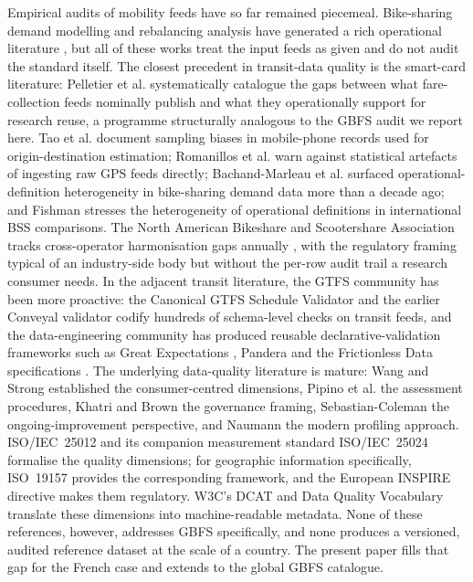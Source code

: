 \documentclass[11pt,a4paper]{article}
\begin{document}
Empirical audits of mobility feeds have so far remained piecemeal.
Bike-sharing demand modelling and rebalancing analysis have generated
a rich operational literature
\cite{Buehler2017BikeShare,Medard2017Rebalancing,Eren2020Review}, but
all of these works treat the input feeds as given and do not audit
the standard itself. The closest precedent in transit-data quality
is the smart-card literature: Pelletier et al.
\cite{Pelletier2011SmartCard} systematically catalogue the gaps
between what fare-collection feeds nominally publish and what they
operationally support for research reuse, a programme structurally
analogous to the GBFS audit we report here.
Tao et al. \cite{Tao2020} document sampling biases in
mobile-phone records used for origin-destination estimation;
Romanillos et al. \cite{Romanillos2016} warn against
statistical artefacts of ingesting raw GPS feeds directly;
Bachand-Marleau et al. \cite{BachandMarleau2012} surfaced
operational-definition heterogeneity in bike-sharing demand data
more than a decade ago; and Fishman \cite{Fishman2016} stresses the
heterogeneity of operational definitions in international BSS
comparisons. The North American Bikeshare and Scootershare
Association tracks cross-operator harmonisation gaps annually
\cite{NABSA2024StateOfIndustry}, with the regulatory framing
typical of an industry-side body but without the per-row audit
trail a research consumer needs.
In the adjacent transit literature, the GTFS community has been more
proactive: the Canonical GTFS Schedule Validator
\cite{MobilityData2024Validator} and the earlier Conveyal validator
\cite{Antrim2013Conveyal} codify hundreds of schema-level checks on
transit feeds, and the data-engineering community has produced reusable
declarative-validation frameworks such as Great Expectations
\cite{GreatExpectations2024}, Pandera \cite{Pandera2024} and the
Frictionless Data specifications \cite{FrictionlessData2023}.
The underlying data-quality literature is mature: Wang and Strong
\cite{Wang1996Quality} established the consumer-centred dimensions,
Pipino et al. \cite{Pipino2002Assessment} the assessment
procedures, Khatri and Brown \cite{Khatri2010DataGovernance} the
governance framing, Sebastian-Coleman \cite{SebastianColeman2013}
the ongoing-improvement perspective, and Naumann
\cite{Naumann2014DataProfiling} the modern profiling approach. ISO/IEC~25012 \cite{ISO25012} and its companion
measurement standard ISO/IEC~25024 \cite{ISO25024} formalise the
quality dimensions; for geographic information specifically,
ISO~19157 \cite{ISO19157} provides the corresponding framework, and
the European INSPIRE directive \cite{INSPIRE2007} makes them
regulatory. W3C's DCAT \cite{DCAT2020} and Data Quality Vocabulary
\cite{W3CDQV} translate these dimensions into machine-readable
metadata. None of these references, however, addresses GBFS
specifically, and none produces a versioned, audited reference
dataset at the scale of a country. The present paper fills that gap
for the French case and extends to the global GBFS catalogue.
\end{document}
